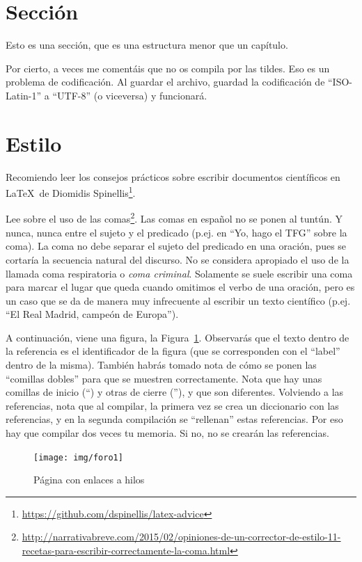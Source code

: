 \documentclass[a4paper, 12pt]{book}
\begin{document}
\section{Sección}
\label{sec:seccion}

Esto es una sección, que es una estructura menor que un capítulo. 

Por cierto, a veces me comentáis que no os compila por las tildes.
Eso es un problema de codificación.
Al guardar el archivo, guardad la codificación de ``ISO-Latin-1'' a ``UTF-8'' (o viceversa) y funcionará.

\section{Estilo}
\label{subsec:estilo}

Recomiendo leer los consejos prácticos sobre escribir documentos científicos en \LaTeX \ de Diomidis Spinellis\footnote{\url{https://github.com/dspinellis/latex-advice}}.

Lee sobre el uso de las comas\footnote{\url{http://narrativabreve.com/2015/02/opiniones-de-un-corrector-de-estilo-11-recetas-para-escribir-correctamente-la-coma.html}}. 
Las comas en español no se ponen al tuntún.
Y nunca, nunca entre el sujeto y el predicado (p.ej. en ``Yo, hago el TFG'' sobre la coma).
La coma no debe separar el sujeto del predicado en una oración, pues se cortaría la secuencia natural del discurso.
No se considera apropiado el uso de la llamada coma respiratoria o \emph{coma criminal}.
Solamente se suele escribir una coma para marcar el lugar que queda cuando omitimos el verbo de una oración, pero es un caso que se da de manera muy infrecuente al escribir un texto científico (p.ej. ``El Real Madrid, campeón de Europa'').

A continuación, viene una figura, la Figura~\ref{figura:foro_hilos}. 
Observarás que el texto dentro de la referencia es el identificador de la figura (que se corresponden con el ``label'' dentro de la misma). 
También habrás tomado nota de cómo se ponen las ``comillas dobles'' para que se muestren correctamente. 
Nota que hay unas comillas de inicio (``) y otras de cierre (''), y que son diferentes.
Volviendo a las referencias, nota que al compilar, la primera vez se crea un diccionario con las referencias, y en la segunda compilación se ``rellenan'' estas referencias. 
Por eso hay que compilar dos veces tu memoria.
Si no, no se crearán las referencias.



 \begin{figure}
    \centering
    \texttt{[image: img/foro1]}
    \caption{Página con enlaces a hilos}
    \label{figura:foro_hilos}
 \end{figure}
\end{document}
